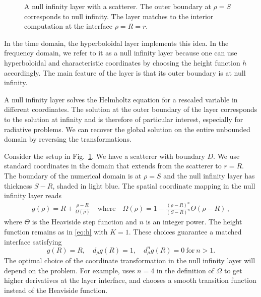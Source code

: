 \documentclass[draft,onefignum,onetabnum]{siamart190516}
\begin{document}
\begin{figure}[tbhp]
\centering
{}
\caption{A null infinity layer with a scatterer. The outer boundary at $\rho=S$ corresponds to null infinity. The layer matches to the interior computation at the interface $\rho=R=r$.}
\label{fig:annulus}
\end{figure}

In the time domain, the hyperboloidal layer \cite{ZENGINOGLU20112286} implements this idea. In the frequency domain, we refer to it as a null infinity layer because one can use hyperboloidal and characteristic coordinates by choosing the height function $h$ accordingly. The main feature of the layer is that its outer boundary is at null infinity. 

A null infinity layer solves the Helmholtz equation for a rescaled variable in different coordinates. The solution at the outer boundary of the layer corresponds to the solution at infinity and is therefore of particular interest, especially for radiative problems. We can recover the global solution on the entire unbounded domain by reversing the transformations. 

Consider the setup in Fig.~\ref{fig:annulus}. We have a scatterer with boundary $D$. We use standard coordinates in the domain that extends from the scatterer to $r=R$. The boundary of the numerical domain is at $\rho=S$ and the null infinity layer has thickness $S-R$, shaded in light blue. The spatial coordinate mapping in the null infinity layer reads
\begin{align}\label{eq:layer}
g(\rho)=R+ \frac{\rho-R}{\Omega(\rho)} \quad \mathrm{where} \quad \Omega(\rho) = 1 - \frac{(\rho-R)^n}{(S-R)^n}\Theta(\rho-R)\,,
\end{align}
where $\Theta$ is the Heaviside step function and $n$ is an integer power. The height function remains as in \eqref{eq:h} with $K=1$. These choices guarantee a matched interface satisfying
\[ g(R) = R, \quad d_\rho g(R) = 1, \quad d_\rho^n g(R) = 0 \ \mathrm{for} \ n>1. \] 
The optimal choice of the coordinate transformation in the null infinity layer will depend on the problem. For example, \cite{bernuzzi2011binary} uses $n=4$ in the definition of $\Omega$ to get higher derivatives at the layer interface, and \cite{hilditch2018evolution} chooses a smooth transition function instead of the Heaviside function.
\end{document}
